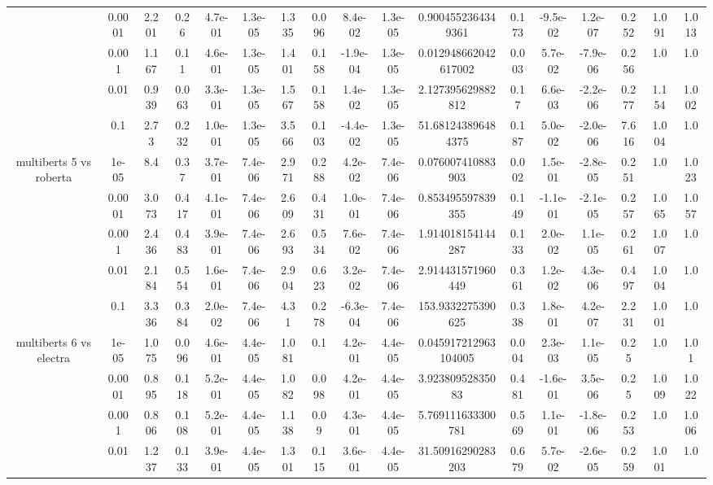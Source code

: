 \begin{tabular}{|c|c|c|c|c|c|c|c|c|c|c|c|c|c|c|c|c|}
 & 0.0001 & 2.201 & 0.26 & 4.7e-01 & 1.3e-05 & 1.335 & 0.096 & 8.4e-02 & 1.3e-05 & 0.9004552364349361 & 0.173 & -9.5e-02 & 1.2e-07 & 0.252 & 1.091 & 1.013 \\
 & 0.001 & 1.167 & 0.11 & 4.6e-01 & 1.3e-05 & 1.401 & 0.158 & -1.9e-04 & 1.3e-05 & 0.012948662042617002 & 0.003 & 5.7e-02 & -7.9e-06 & 0.256 & 1.0 & 1.0 \\
 & 0.01 & 0.939 & 0.063 & 3.3e-01 & 1.3e-05 & 1.567 & 0.158 & 1.4e-02 & 1.3e-05 & 2.127395629882812 & 0.17 & 6.6e-03 & -2.2e-06 & 0.277 & 1.154 & 1.002 \\
 & 0.1 & 2.73 & 0.232 & 1.0e-01 & 1.3e-05 & 3.566 & 0.103 & -4.4e-02 & 1.3e-05 & 51.681243896484375 & 0.187 & 5.0e-02 & -2.0e-06 & 7.616 & 1.004 & 1.0 \\
\hline
\multirow{5}{*}{multiberts 5 vs roberta } & 1e-05 & 8.4 & 0.37 & 3.7e-01 & 7.4e-06 & 2.971 & 0.288 & 4.2e-02 & 7.4e-06 & 0.076007410883903 & 0.002 & 1.5e-01 & -2.8e-05 & 0.251 & 1.0 & 1.023 \\
 & 0.0001 & 3.073 & 0.417 & 4.1e-01 & 7.4e-06 & 2.609 & 0.431 & 1.0e-01 & 7.4e-06 & 0.853495597839355 & 0.149 & -1.1e-01 & -2.1e-05 & 0.257 & 1.065 & 1.057 \\
 & 0.001 & 2.436 & 0.483 & 3.9e-01 & 7.4e-06 & 2.693 & 0.534 & 7.6e-02 & 7.4e-06 & 1.914018154144287 & 0.133 & 2.0e-02 & 1.1e-05 & 0.261 & 1.007 & 1.0 \\
 & 0.01 & 2.184 & 0.554 & 1.6e-01 & 7.4e-06 & 2.904 & 0.623 & 3.2e-02 & 7.4e-06 & 2.914431571960449 & 0.361 & 1.2e-02 & 4.3e-06 & 0.497 & 1.004 & 1.0 \\
 & 0.1 & 3.336 & 0.384 & 2.0e-02 & 7.4e-06 & 4.31 & 0.278 & -6.3e-04 & 7.4e-06 & 153.9332275390625 & 0.338 & 1.8e-01 & 4.2e-07 & 2.231 & 1.001 & 1.0 \\
\hline
\multirow{5}{*}{multiberts 6 vs electra } & 1e-05 & 1.075 & 0.096 & 4.6e-01 & 4.4e-05 & 1.081 & 0.1 & 4.2e-01 & 4.4e-05 & 0.045917212963104005 & 0.004 & 2.3e-03 & 1.1e-05 & 0.25 & 1.0 & 1.01 \\
 & 0.0001 & 0.895 & 0.118 & 5.2e-01 & 4.4e-05 & 1.082 & 0.098 & 4.2e-01 & 4.4e-05 & 3.92380952835083 & 0.481 & -1.6e-01 & 3.5e-06 & 0.25 & 1.009 & 1.022 \\
 & 0.001 & 0.806 & 0.108 & 5.2e-01 & 4.4e-05 & 1.138 & 0.09 & 4.3e-01 & 4.4e-05 & 5.769111633300781 & 0.569 & 1.1e-01 & -1.8e-06 & 0.253 & 1.0 & 1.006 \\
 & 0.01 & 1.237 & 0.133 & 3.9e-01 & 4.4e-05 & 1.301 & 0.115 & 3.6e-01 & 4.4e-05 & 31.50916290283203 & 0.679 & 5.7e-02 & -2.6e-05 & 0.259 & 1.001 & 1.0 \\

\end{tabular}
